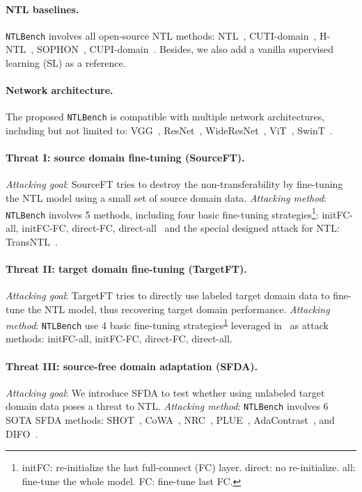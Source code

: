 \paragraph{NTL baselines.}
\texttt{NTLBench} involves all open-source NTL methods: NTL~\cite{wang2021non}, CUTI-domain~\cite{wang2023model}, H-NTL~\cite{hong2024improving}, SOPHON~\cite{deng2024sophon}, CUPI-domain~\cite{wang2024say}. Besides, we also add a vanilla supervised learning (SL) as a reference.

\paragraph{Network architecture.}
The proposed \texttt{NTLBench} is compatible with multiple network architectures, including but not limited to: 
VGG~\cite{simonyan2014very}, ResNet~\cite{he2016deep}, WideResNet~\cite{zagoruyko2016wide}, ViT~\cite{dosovitskiy2020image}, SwinT~\cite{liu2021swin}.

\paragraph{Threat I: source domain fine-tuning (SourceFT).} \textit{Attacking goal}: SourceFT tries to destroy the non-transferability by fine-tuning the NTL model using a small set of source domain data. \textit{Attacking method}: \texttt{NTLBench} involves 5 methods, including four basic fine-tuning strategies\footnote{\label{initfc}initFC: re-initialize the last full-connect (FC) layer. direct: no re-initialize. all: fine-tune the whole model. FC: fine-tune last FC.}: initFC-all, initFC-FC, direct-FC, direct-all~\cite{deng2024sophon} and the special designed attack for NTL: TransNTL~\cite{hong2024your}. 


\paragraph{Threat II: target domain fine-tuning (TargetFT).} \textit{Attacking goal}: TargetFT tries to directly use labeled target domain data to fine-tune the NTL model, thus recovering target domain performance. \textit{Attacking method}: \texttt{NTLBench} use 4 basic fine-tuning strategies\textsuperscript{\ref{initfc}} leveraged in~\cite{deng2024sophon} as attack methods: initFC-all, initFC-FC, direct-FC, direct-all.

\paragraph{Threat III: source-free domain adaptation (SFDA).} \textit{Attacking goal}: We introduce SFDA to test whether using unlabeled target domain data poses a threat to NTL. \textit{Attacking method}: \texttt{NTLBench} involves 6 SOTA SFDA methods: SHOT~\cite{liang2020we}, CoWA~\cite{lee2022confidence}, NRC~\cite{yang2021exploiting}, PLUE~\cite{litrico2023guiding}, AdaContrast~\cite{chen2022contrastive}, and DIFO~\cite{tang2024source}.

